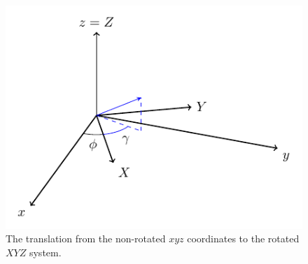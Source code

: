 \documentclass[aps,pra,10pt,amsmath,twocolumn,letterpaper]{revtex4-1}
\begin{document}
\begin{figure}[t]
\centering
\includegraphics[width=0.9\linewidth]{fig-axes}
\caption{The translation from the non-rotated $xyz$ coordinates to the rotated
$XYZ$ system.}
\label{fig:axes}
\end{figure}
\end{document}
